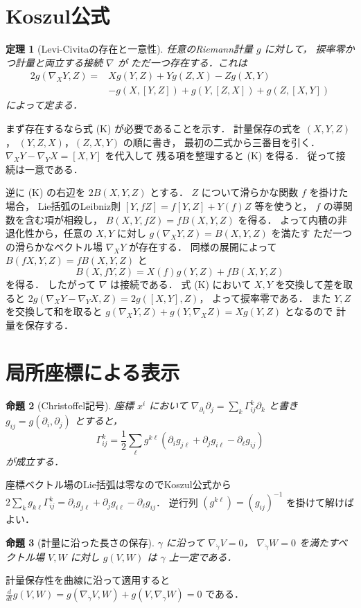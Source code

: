 \documentclass[a5paper,10pt,onecolumn]{jsarticle}
\makeatletter
\theoremstyle{mathnotetheorem}
\newtheorem{theorem}{定理}[section]
\newtheorem{proposition}[theorem]{命題}
\renewcommand{\proofname}{証明}
\renewenvironment{proof}[1][\proofname]{%
  \par\pushQED{\qed}\normalfont\topsep4\p@\@plus2\p@\relax
  \trivlist\item[\hskip\labelsep\bfseries #1]\ignorespaces
}{\popQED\endtrivlist\@endpefalse}
\makeatother
\begin{document}
\section{Koszul公式}
\begin{theorem}[Levi-Civitaの存在と一意性]\label{thm:levi}
任意のRiemann計量 $g$ に対して，
捩率零かつ計量と両立する接続 $\nabla$ が
ただ一つ存在する．これは
\[
\begin{aligned}
2g(\nabla_XY,Z)
={}&Xg(Y,Z)+Yg(Z,X)-Zg(X,Y)\\
&-g(X,[Y,Z])+g(Y,[Z,X])+g(Z,[X,Y])
\end{aligned}
\tag{K}
\]
によって定まる．
\end{theorem}
\begin{proof}
まず存在するなら式 (K) が必要であることを示す．
計量保存の式を $(X,Y,Z)$，
$(Y,Z,X)$，$(Z,X,Y)$ の順に書き，
最初の二式から三番目を引く．
$\nabla_XY-\nabla_YX=[X,Y]$ を代入して
残る項を整理すると (K) を得る．
従って接続は一意である．

逆に (K) の右辺を $2B(X,Y,Z)$ とする．
$Z$ について滑らかな関数 $f$ を掛けた場合，
Lie括弧のLeibniz則
$[Y,fZ]=f[Y,Z]+Y(f)Z$ 等を使うと，
$f$ の導関数を含む項が相殺し，
$B(X,Y,fZ)=fB(X,Y,Z)$ を得る．
よって内積の非退化性から，任意の $X,Y$ に対し
$g(\nabla_XY,Z)=B(X,Y,Z)$ を満たす
ただ一つの滑らかなベクトル場 $\nabla_XY$ が存在する．
同様の展開によって
$B(fX,Y,Z)=fB(X,Y,Z)$ と
\[
 B(X,fY,Z)=X(f)g(Y,Z)+fB(X,Y,Z)
\]
を得る．
したがって $\nabla$ は接続である．
式 (K) において $X,Y$ を交換して差を取ると
$2g(\nabla_XY-\nabla_YX,Z)=2g([X,Y],Z)$，
よって捩率零である．
また $Y,Z$ を交換して和を取ると
$g(\nabla_XY,Z)+g(Y,\nabla_XZ)=Xg(Y,Z)$ となるので
計量を保存する．
\end{proof}
\section{局所座標による表示}
\begin{proposition}[Christoffel記号]\label{prop:christoffel}
座標 $x^i$ において
$\nabla_{\partial_i}\partial_j
=\sum_k\Gamma^k_{ij}\partial_k$ と書き
$g_{ij}=g(\partial_i,\partial_j)$ とすると，
\[
 \Gamma^k_{ij}=
 \frac12\sum_\ell g^{k\ell}
 (\partial_i g_{j\ell}+\partial_jg_{i\ell}-\partial_\ell g_{ij})
\]
が成立する．
\end{proposition}
\begin{proof}
座標ベクトル場のLie括弧は零なのでKoszul公式から
$2\sum_kg_{k\ell}\Gamma^k_{ij}
=\partial_i g_{j\ell}+\partial_jg_{i\ell}
-\partial_\ell g_{ij}$．
逆行列 $(g^{k\ell})=(g_{ij})^{-1}$ を掛けて解けばよい．
\end{proof}
\begin{proposition}[計量に沿った長さの保存]
$\gamma$ に沿って $\nabla_{\dot\gamma}V=0$，
$\nabla_{\dot\gamma}W=0$ を満たすベクトル場 $V,W$ に対し
$g(V,W)$ は $\gamma$ 上一定である．
\end{proposition}
\begin{proof}
計量保存性を曲線に沿って適用すると
$\frac d{dt}g(V,W)=
g(\nabla_{\dot\gamma}V,W)+g(V,\nabla_{\dot\gamma}W)=0$ である．
\end{proof}
\end{document}
